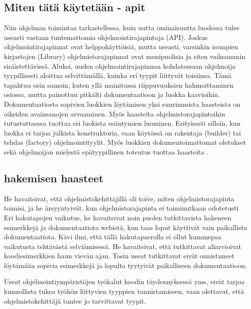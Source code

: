 \documentclass[finnish]{../tktltiki2}
\theoremstyle{definition}
\theoremstyle{remark}
\begin{document}
\subsection{Miten tätä käytetään - apit}
Niin ohjelman toimintaa tarkastellessa, kuin uutta ominaisuutta luodessa tulee useasti vastaan tuntemattomia ohjelmointirajapintoja (API). Joskus ohjelmointirajapinnat ovat helppokäyttöisiä, mutta useasti, varsinkin isompien kirjastojen (Library) ohjelmistorajapinnat ovat monipuolisia ja siten vaikeammin sisäistettävissä. Aluksi, uuden ohjelmointirajapinnan kohdatessaan ohjelmoija tyypillisesti aloittaa selvittämällä, kuinka eri tyypit liittyvät toisiinsa. Tämä tapahtuu osin samoin, kuten yllä mainitussa riippuvuuksien hahmoittaminen osiossa, mutta painottuu pitkälti dokumentaatioon ja luokka kaavioihin. Dokumentaatiosta sopivien luokkien löytämisen yksi suurimmista haasteista on oikeiden avainsanojen arvaaminen. Myös haasteita ohjelmistorajapintoihin tutustuttaessa tuottaa eri luokista esiintymien luominen. Erityisesti silloin, kun luokka ei tarjoa julkista konstruktoria, vaan käytössä on rakentaja (builder) tai tehdas (factory) ohjelmointityylit. Myös luokkien dokumentoimattomat oletukset sekä ohjelmoijan mielestä epätyypillinen toteutus tuottaa haasteita \cite{asking-and-answering-api-questions}.

\subsection{hakemisen haasteet}
He havaitsivat, että ohjelmistokehittäjillä oli toive, miten ohjelmistorajapinta toimisi, ja he ärsyyntyivät, kun ohjelmistorajapinta ei toiminutkaan odotetusti \cite{asking-and-answering-api-questions}
Eri hakutapojen vaikutus, he havaitsivat noin puolen tutkittavista hakeneen esimerkkejä ja dokumentaatiota webistä, kun taas loput käyttivät vain paikallista dokumentaatiota. Kävi ilmi, että tällä hakutapaerolla ei ollut kummepaa vaikutusta tehtävästä selviämisessä. He havaitsivat, että tutkittavat aliarvioivat koodiesimerkkien haun vievän ajan. Tosin useat tutkittavat eivät onnistuneet löytämään sopivia esimerkkejä ja lopulta tyytyivät paikalliseen dokumentaatioon.  \cite{asking-and-answering-api-questions}

Useat ohjelmointiympäristöjen työkalut koodin täydennyksessä yms, eivät tarjoa kunnollista tukea työhön liittyvien tyyppien tunnistamiseen, vaan olettavat, että ohjelmistokehittäjä tuntee jo tarvittavat tyypit.  \cite{asking-and-answering-api-questions}
\end{document}
